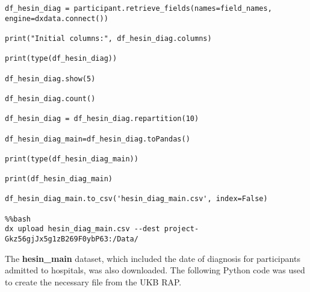 \documentclass[11pt]{article}
\begin{document}
\begin{lstlisting}[style=PythonStyle]
df_hesin_diag = participant.retrieve_fields(names=field_names, engine=dxdata.connect())

print("Initial columns:", df_hesin_diag.columns)

print(type(df_hesin_diag))

df_hesin_diag.show(5)

df_hesin_diag.count()

df_hesin_diag = df_hesin_diag.repartition(10)

df_hesin_diag_main=df_hesin_diag.toPandas()

print(type(df_hesin_diag_main))

print(df_hesin_diag_main)

df_hesin_diag_main.to_csv('hesin_diag_main.csv', index=False)

%%bash
dx upload hesin_diag_main.csv --dest project-Gkz56gjJx5g1zB269F0ybP63:/Data/
\end{lstlisting}
\color{black}
The \textbf{hesin\_main} dataset, which included the date of diagnosis for participants admitted to hospitals, was also downloaded. The following Python code was used to create the necessary file from the UKB RAP.
\color{violet} 
\end{document}
